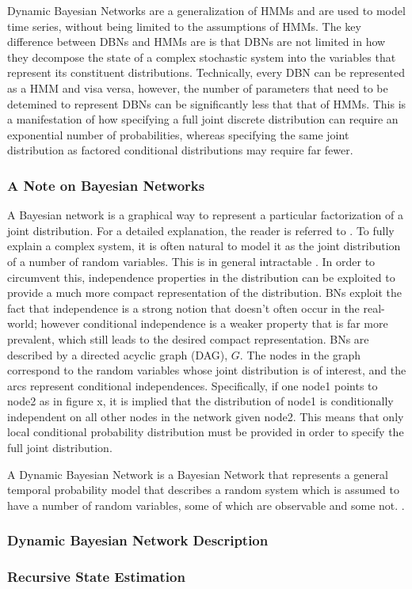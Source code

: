 \placeholder{}
Dynamic Bayesian Networks are a generalization of HMMs and are used to model time series, without being limited to the assumptions of HMMs. The key difference between DBNs and HMMs are is that DBNs are not limited in how they decompose the state of a complex stochastic system into the variables that represent its constituent distributions\cite{AIAMA}. Technically, every DBN can be represented as a HMM and visa versa, however, the number of parameters that need to be detemined to represent DBNs can be significantly less that that of HMMs. This is a manifestation of how specifying a full joint discrete distribution can require an exponential number of probabilities, whereas specifying the same joint distribution as factored conditional distributions may require far fewer.

\subsubsection{A Note on Bayesian Networks}
A Bayesian network is a graphical way to represent a particular factorization of a joint distribution. For a detailed explanation, the reader is referred to \cite{KollerPGM}. To fully explain a complex system, it is often natural to model it as the joint distribution of a number of random variables. This is in general intractable \cite{KollerPGM}. In order to circumvent this, independence properties in the distribution can be exploited to provide a much more compact representation of the distribution. BNs exploit the fact that independence is a strong notion that doesn't often occur in the real-world; however conditional independence is a weaker property that is far more prevalent, which still leads to the desired compact representation. BNs are described by a directed acyclic graph (DAG), $G$. The nodes in the graph correspond to the random variables whose joint distribution is of interest, and the arcs represent conditional independences. Specifically, if one node1 points to node2 as in figure x, it is implied that the distribution of node1 is conditionally independent on all other nodes in the network given node2. This means that only local conditional probability distribution must be provided in order to specify the full joint distribution.

A Dynamic Bayesian Network is a Bayesian Network that represents a general temporal probability model that describes a random system which is assumed to have a number of random variables, some of which are observable and some not. \cite{AIAMA}.

\subsubsection{Dynamic Bayesian Network Description}

\subsubsection{Recursive State Estimation}


\subsubsection{}
